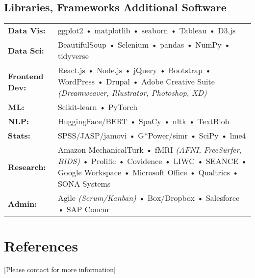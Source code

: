 \documentclass[10pt,a4paper]{cv_public}
\begin{document}
\subsection{Libraries, Frameworks \bf{\Plus} Additional Software}
\begingroup
\renewcommand{\arraystretch}{1.5}
\begin{tabular}{p{1.5in}<{\raggedleft\arraybackslash}p{4.435in}<{\raggedright\arraybackslash}}
{\bf Data Vis:} & ggplot2 • matplotlib • seaborn • Tableau • D3.js \\
{\bf Data Sci:} & BeautifulSoup • Selenium • pandas • NumPy • tidyverse \\
{\bf Frontend Dev:} & React.js • Node.js • jQuery • Bootstrap • WordPress • Drupal • Adobe Creative Suite \textsl{(Dreamweaver, Illustrator, Photoshop, XD)} \\
{\bf ML:} & Scikit-learn • PyTorch \\ %
{\bf NLP:} & HuggingFace/BERT • SpaCy • nltk • TextBlob \\
{\bf Stats:} & SPSS/JASP/jamovi • G*Power/simr • SciPy • lme4 \\
{\bf Research:} & Amazon MechanicalTurk • fMRI \textsl{(AFNI, FreeSurfer, BIDS)} • Prolific • Covidence • LIWC • SEANCE • Google Workspace • Microsoft Office • Qualtrics • SONA Systems \\
{\bf Admin:} & Agile \textsl{(Scrum/Kanban)} • Box/Dropbox • Salesforce • SAP Concur
\end{tabular}
\endgroup
\vspace{0pt}


\section{References}
[Please contact for more information]
\end{document}
